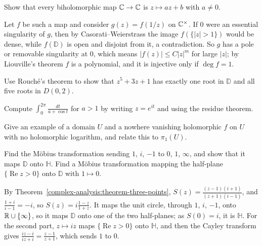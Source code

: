 \begin{exercise}\label{complex-analysis:exercise-automorphisms-plane}
Show that every biholomorphic map $\mathbb{C} \to \mathbb{C}$ is $z \mapsto az + b$ with $a \neq 0$.
\end{exercise}

\begin{solution}
Let $f$ be such a map and consider $g(z) = f(1/z)$ on $\mathbb{C}^\times$. If $0$ were an essential singularity of $g$, then by Casorati--Weierstrass the image $f(\{|z| > 1\})$ would be dense, while $f(\mathbb{D})$
is open and disjoint from it, a contradiction. So $g$ has a pole or removable singularity at $0$, which means $|f(z)| \leq C|z|^m$ for large $|z|$; by Liouville's theorem $f$ is a polynomial, and it is
injective only if $\deg f = 1$.
\end{solution}

\begin{exercise}\label{complex-analysis:exercise-rouche-roots}
Use Rouch\'e's theorem to show that $z^5 + 3z + 1$ has exactly one root in $\mathbb{D}$ and all five roots in $D(0, 2)$.
\end{exercise}

\begin{exercise}\label{complex-analysis:exercise-residue-trigonometric}
Compute $\int_0^{2\pi}\frac{dt}{a + \cos t}$ for $a > 1$ by writing $z = e^{it}$ and using the residue theorem.
\end{exercise}

\begin{exercise}\label{complex-analysis:exercise-cauchy-not-converse}
Give an example of a domain $U$ and a nowhere vanishing holomorphic $f$ on $U$ with no holomorphic logarithm, and relate this to $\pi_1(U)$.
\end{exercise}

\begin{exercise}\label{complex-analysis:exercise-mobius-disc-half-plane}
Find the M\"obius transformation sending $1$, $i$, $-1$ to $0$, $1$, $\infty$, and show that it maps $\mathbb{D}$ onto $\mathbb{H}$. Find a M\"obius transformation mapping the half-plane $\{\operatorname{Re}z > 0\}$ onto $\mathbb{D}$
with $1 \mapsto 0$.
\end{exercise}

\begin{solution}
By Theorem~\ref{complex-analysis:theorem-three-points}, $S(z) = \frac{(z - 1)(i + 1)}{(z + 1)(i - 1)}$, and $\frac{1 + i}{i - 1} = -i$, so $S(z) = i\frac{1 - z}{1 + z}$. It maps the unit circle, through $1$, $i$, $-1$, onto
$\mathbb{R} \cup \{\infty\}$, so it maps $\mathbb{D}$ onto one of the two half-planes; as $S(0) = i$, it is $\mathbb{H}$. For the second part, $z \mapsto iz$ maps $\{\operatorname{Re}z > 0\}$ onto $\mathbb{H}$, and then the Cayley
transform gives $\frac{iz - i}{iz + i} = \frac{z - 1}{z + 1}$, which sends $1$ to $0$.
\end{solution}

